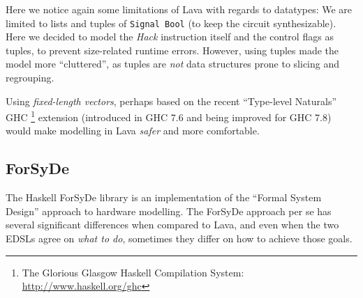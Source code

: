 \documentclass[a4paper]{article}
\begin{document}
                Here we notice again some limitations of Lava with regards to datatypes: We are
                limited to lists and tuples of \texttt{Signal Bool} (to keep the circuit
                synthesizable). Here we decided to model the \emph{Hack} instruction itself and
                the control flags as tuples, to prevent size-related runtime errors. However, using
                tuples made the model more ``cluttered'', as tuples are \emph{not} data structures
                prone to slicing and regrouping.

                Using \emph{fixed-length vectors}, perhaps based on the recent ``Type-level
                Naturals'' GHC
                \footnote{The Glorious Glasgow Haskell Compilation System:
                    \url{http://www.haskell.org/ghc}}
                extension
                (introduced in GHC 7.6 and being improved for GHC 7.8) would make modelling in Lava
                \emph{safer} and more comfortable.


        \subsection{ForSyDe}
        \label{subsec:forsyde}
            The Haskell ForSyDe library is an implementation of the ``Formal System Design''
            approach to hardware modelling\cite{forsyde1999}. The ForSyDe approach per se has
            several significant differences when compared to Lava, and even when the two EDSLs agree
            on \emph{what to do}, sometimes they differ on how to achieve those goals.
\end{document}
